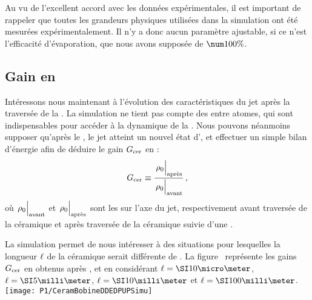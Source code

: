 Au vu de l'excellent accord avec les données expérimentales, il est important de rappeler que toutes les grandeurs physiques utilisées dans la simulation ont été mesurées expérimentalement. Il n'y a donc aucun paramètre ajustable, si ce n'est l'efficacité d'évaporation, que nous avons supposée de $\val{100}\%$.


{\AjouteLigne \AjouteLigne}

\subsection{Gain en \ddedpup}\label{sec:CeramSimuGain}
Intéressons nous maintenant à l'évolution des caractéristiques du jet après la traversée de la \pdec. La simulation ne tient pas compte des \colels entre atomes, qui sont indispensables pour accéder à la dynamique de la \reth. 
Nous pouvons néanmoins supposer qu'après le \fisp, le jet atteint un nouvel état d'\eqthdy, et effectuer un simple bilan d'énergie afin de déduire le gain ${G_{\rm cer}}$ en \ddedpup:
\[
\GainCeram \equiv \frac{\AvecTexte{\rhojetaxe}{après}}{\AvecTexte{\rhojetaxe}{avant}}
\virguleformule
\]
où $\AvecTexte{\rhojetaxe}{avant}$ et $\AvecTexte{\rhojetaxe}{après}$ sont les \ddedpup sur l'axe du jet, respectivement avant traversée de la céramique et après traversée de la céramique suivie d'une \reth.

La simulation permet de nous intéresser à des situations pour lesquelles la longueur ${\ell}$ de la céramique serait différente de . 
La figure~ représente les gains ${G_{\rm cer}}$ en \ddedpup obtenus après \reth, et en considérant $\CeramLong=\micron{10}$, $\CeramLong=\mm{5}$, $\CeramLong=\mm{10}$ et $\CeramLong=\mm{100}$.
%
\bfighs
\texttt{[image: P1/CeramBobineDDEDPUPSimu]}
\RemonteUnPeuFig
\RemonteUnPeuFig
{}
\label{fig:CeramBobineDDEDPUPSimu}
\efigh


